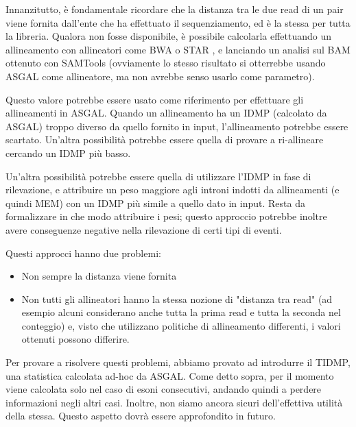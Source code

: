 Innanzitutto, è fondamentale ricordare che la distanza tra le due read di un pair viene fornita dall'ente che ha effettuato il sequenziamento, ed è la stessa per tutta la libreria. Qualora non fosse disponibile, è possibile calcolarla effettuando un allineamento con allineatori come BWA \cite{li2013aligning} o STAR \cite{dobin2013star}, e lanciando un analisi sul BAM ottenuto con SAMTools (ovviamente lo stesso risultato si otterrebbe usando ASGAL come allineatore, ma non avrebbe senso usarlo come parametro).

Questo valore potrebbe essere usato come riferimento per effettuare gli allineamenti in ASGAL. Quando un allineamento ha un IDMP (calcolato da ASGAL) troppo diverso da quello fornito in input, l'allineamento potrebbe essere scartato. Un'altra possibilità potrebbe essere quella di provare a ri-allineare cercando un IDMP più basso. 

Un'altra possibilità potrebbe essere quella di utilizzare l'IDMP in fase di rilevazione, e attribuire un peso maggiore agli introni indotti da allineamenti (e quindi MEM) con un IDMP più simile a quello dato in input. Resta da formalizzare in che modo attribuire i pesi; questo approccio potrebbe inoltre avere conseguenze negative nella rilevazione di certi tipi di eventi.

Questi approcci hanno due problemi:
\begin{itemize}
	\item Non sempre la distanza viene fornita
	\item Non tutti gli allineatori hanno la stessa nozione di "distanza tra read" (ad esempio alcuni considerano anche tutta la prima read e tutta la seconda nel conteggio) e, visto che utilizzano politiche di allineamento differenti, i valori ottenuti possono differire.
\end{itemize}

Per provare a risolvere questi problemi, abbiamo provato ad introdurre il TIDMP, una statistica calcolata ad-hoc da ASGAL. Come detto sopra, per il momento viene calcolata solo nel caso di esoni consecutivi, andando quindi a perdere informazioni negli altri casi. Inoltre, non siamo ancora sicuri dell'effettiva utilità della stessa. Questo aspetto dovrà essere approfondito in futuro.

\newpage